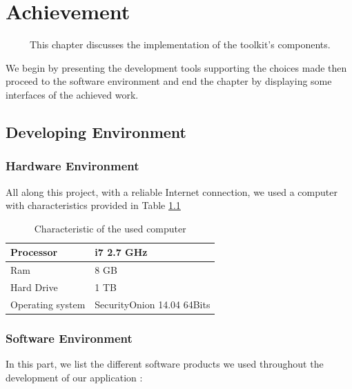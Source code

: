 
\chapter {Achievement}
\renewcommand{\chaptername}{Chapter}

~~~~~This chapter discusses the implementation of the toolkit’s components.

We begin by presenting the development tools supporting the choices made then proceed to the software environment and end the chapter by displaying some interfaces of the achieved work.
\section{Developing Environment}


\subsection {Hardware Environment}
All along this project, with a reliable Internet connection, we used a computer with characteristics provided in Table \ref{computers}


\begin{table}[!htbp]

\begin{center}
\begin{tabular}{| m{5em} | m{6cm} | }
\hline
Processor & i7 2.7 GHz \\ 
\hline
Ram & 8 GB\\ 
\hline
Hard Drive & 1 TB  \\ 
\hline
Operating system & SecurityOnion 14.04 64Bits
\hline
\end{tabular}
\label{computers}
\end{center}
\caption{Characteristic of the used computer}
\end{table}


\subsection {Software Environment}
In this part, we list the different software products we used throughout the development of our application : 




